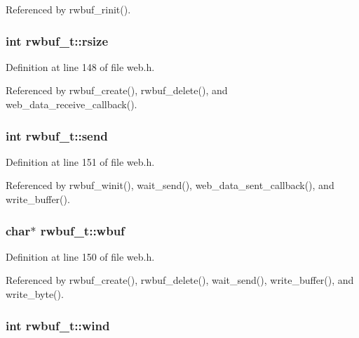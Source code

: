 Referenced by rwbuf\+\_\+rinit().

\subsubsection[{\texorpdfstring{rsize}{rsize}}]{\setlength{\rightskip}{0pt plus 5cm}int rwbuf\+\_\+t\+::rsize}\hypertarget{structrwbuf__t_aa4094c7e329ae85cc50dbd06d3b50d44}{}\label{structrwbuf__t_aa4094c7e329ae85cc50dbd06d3b50d44}


Definition at line 148 of file web.\+h.



Referenced by rwbuf\+\_\+create(), rwbuf\+\_\+delete(), and web\+\_\+data\+\_\+receive\+\_\+callback().

\subsubsection[{\texorpdfstring{send}{send}}]{\setlength{\rightskip}{0pt plus 5cm}int rwbuf\+\_\+t\+::send}\hypertarget{structrwbuf__t_a279490994b6576ad00900254a8c07a89}{}\label{structrwbuf__t_a279490994b6576ad00900254a8c07a89}


Definition at line 151 of file web.\+h.



Referenced by rwbuf\+\_\+winit(), wait\+\_\+send(), web\+\_\+data\+\_\+sent\+\_\+callback(), and write\+\_\+buffer().

\subsubsection[{\texorpdfstring{wbuf}{wbuf}}]{\setlength{\rightskip}{0pt plus 5cm}char$\ast$ rwbuf\+\_\+t\+::wbuf}\hypertarget{structrwbuf__t_a68386231f3d907ec4508c090925782a2}{}\label{structrwbuf__t_a68386231f3d907ec4508c090925782a2}


Definition at line 150 of file web.\+h.



Referenced by rwbuf\+\_\+create(), rwbuf\+\_\+delete(), wait\+\_\+send(), write\+\_\+buffer(), and write\+\_\+byte().

\subsubsection[{\texorpdfstring{wind}{wind}}]{\setlength{\rightskip}{0pt plus 5cm}int rwbuf\+\_\+t\+::wind}\hypertarget{structrwbuf__t_a135345eee44e93f37e57dbabec12c339}{}\label{structrwbuf__t_a135345eee44e93f37e57dbabec12c339}


